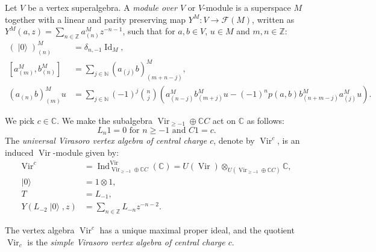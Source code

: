 \documentclass{beamer}
\DeclareMathOperator{\Vir}{Vir}
\DeclareMathOperator{\Id}{Id}
\DeclareMathOperator{\Ind}{Ind}
\DeclareMathOperator{\vac}{|0\rangle}
\begin{document}
\begin{frame}

  Let $V$ be a vertex superalgebra.
  A \emph{module over $V$} or $V$-module is a superspace $M$ together with a linear and parity preserving map $Y^M: V \to \mathcal{F}(M)$, written as $Y^M(a, z) = \sum_{n \in \mathbb{Z}}a^M_{(n)}z^{-n - 1}$, such that for $a, b \in V$, $u \in M$ and $m, n \in \mathbb{Z}$:
  \begin{align*}
    (\vac)^M_{(n)} &= \delta_{n, -1}\Id_M, \\
    [a^M_{(m)}, b^M_{(n)}] &= \sum_{j \in \mathbb{N}}(a_{(j)}b)^M_{(m + n - j)}, \\
    (a_{(n)}b)^M_{(m)}u &= \sum_{j \in \mathbb{N}}(-1)^j\binom{n}{j}(a^M_{(n - j)}b^M_{(m + j)}u - (-1)^np(a, b)b^M_{(n + m - j)}a^M_{(j)}u).
  \end{align*}

\end{frame}

\begin{frame}

  \begin{example}
    \label{exa:1}
    We pick $c \in \mathbb{C}$.
    We make the subalgebra $\Vir_{\ge -1} \oplus \mathbb{C}C$ act on $\mathbb{C}$ as follows:
    \begin{equation*}
      \text{$L_n1 = 0$ for $n \ge -1$ and $C1 = c$}.
    \end{equation*}
    The \emph{universal Virasoro vertex algebra of central charge $c$}, denote by $\Vir^c$, is an induced $\Vir$-module given by:
    \begin{align*}
      \Vir^c &= \Ind^{\Vir}_{\Vir_{\ge -1} \oplus \mathbb{C}C}(\mathbb{C}) = U(\Vir) \otimes_{U(\Vir_{\ge -1} \oplus \mathbb{C}C)} \mathbb{C}, \\
      \vac &= 1\otimes1, \\
      T &= L_{-1}, \\
      Y(L_{-2}\vac, z) &= \sum_{n \in \mathbb{Z}}L_{-n}z^{-n - 2}.
    \end{align*}

    The vertex algebra $\Vir^c$ has a unique maximal proper ideal, and the quotient $\Vir_c$ is the \emph{simple Virasoro vertex algebra of central charge $c$}.
  \end{example}

\end{frame}
\end{document}
